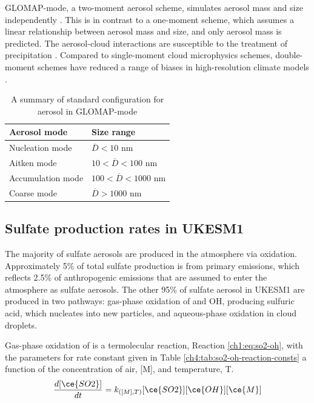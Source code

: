 GLOMAP-mode, a two-moment aerosol scheme, simulates aerosol mass and size independently \citep{mannDescriptionEvaluationGLOMAPmode2010}. This is in contrast to a one-moment scheme, which assumes a linear relationship between aerosol mass and size, and only aerosol mass is predicted. The aerosol-cloud interactions are susceptible to the treatment of precipitation \citep{gettelmanAdvancedTwoMomentBulk2015}. Compared to single-moment cloud microphysics schemes, double-moment schemes have reduced a range of biases in high-resolution climate models \citep{seikiImprovementGlobalCloudSystemResolving2015}. 

\begin{table}
   \caption[Standard configuration for aerosol in GLOMAP-mode]{A summary of standard configuration for aerosol in GLOMAP-mode \citep{mannDescriptionEvaluationGLOMAPmode2010}}
   \label{tab:glomap}
   \centering
   \begin{tabular}{l l}
    \toprule
     Aerosol mode & Size range  \\
    \midrule
     Nucleation mode & $\overline{D} < 10$ nm \\ 
     Aitken mode & $10 < \overline{D} < 100$ nm \\
     Accumulation mode & $100 < \overline{D} < 1000$ nm\\
     Coarse mode & $ \overline{D} > 1000$ nm\\
     \bottomrule
   \end{tabular}
\end{table}


\subsection{Sulfate production rates in UKESM1}
\label{ch2:sec:so4-prod-rate}

The majority of sulfate aerosols are produced in the atmosphere via oxidation. Approximately 5\% of total sulfate production is from primary emissions, which reflects 2.5\% of anthropogenic  emissions that are assumed to enter the atmosphere as sulfate aerosols. The other 95\% of sulfate aerosol in UKESM1 are produced in two pathways: gas-phase oxidation of  and OH, producing sulfuric acid, which nucleates into new particles, and aqueous-phase oxidation in cloud droplets. 

Gas-phase oxidation of  is a termolecular reaction, Reaction \ref{ch1:eq:so2-oh}, with the parameters for rate constant given in Table \ref{ch4:tab:so2-oh-reaction-consts} a function of the concentration of air, [M], and temperature, T.
\begin{align}
    \dfrac{d[\ce{SO2}]}{dt} =  k_{([M],T)} [\ce{SO2}][\ce{OH}][\ce{M}] \label{ch4:eq:so2-oh-prod}
\end{align}

